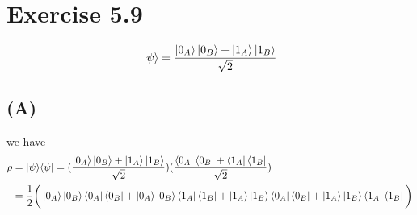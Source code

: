 \documentclass{article}
\newcommand{\op}[2]{|#1\rangle \langle#2|}
\begin{document}
\section*{Exercise 5.9}
\begin{align*}
    \ket{\psi} = \frac{\ket{0_A}\ket{0_B} + \ket{1_A}\ket{1_B}}{\sqrt{2}}
 \end{align*}
 \subsection*{(A)}
 we have
 \begin{align*}
    \rho &= \op{\psi}{\psi} = (\frac{\ket{0_A}\ket{0_B} + \ket{1_A}\ket{1_B}}{\sqrt{2}})(\frac{\bra{0_A}\bra{0_B} + \bra{1_A}\bra{1_B}}{\sqrt{2}}) \\
    &= \frac{1}{2}\bigg(\ket{0_A}\ket{0_B}\bra{0_A}\bra{0_B} + \ket{0_A}\ket{0_B}\bra{1_A}\bra{1_B} + \ket{1_A}\ket{1_B}\bra{0_A}\bra{0_B} + \ket{1_A}\ket{1_B}\bra{1_A}\bra{1_B}\bigg)
 \end{align*}
\end{document}

